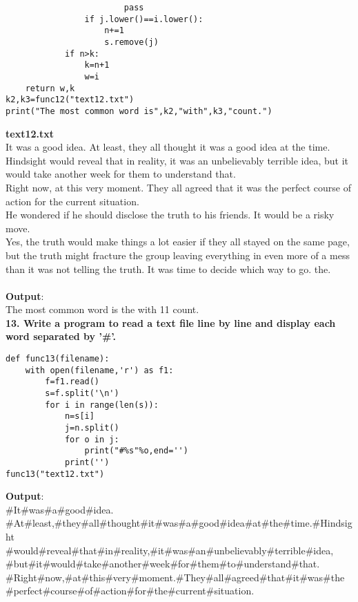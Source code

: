 \documentclass[
a4paper]{article}
\begin{document}
\begin{large}
\begin{verbatim}
                        pass
                if j.lower()==i.lower():
                    n+=1
                    s.remove(j)
            if n>k:
                k=n+1
                w=i    
    return w,k
k2,k3=func12("text12.txt")
print("The most common word is",k2,"with",k3,"count.")
\end{verbatim}
\textbf{text12.txt}\\
It was a good idea. 
At least, they all thought it was a good idea at the time. Hindsight would reveal that in reality, it was an unbelievably terrible idea, but it would take another week for them to understand that. \\
Right now, at this very moment. They all agreed that it was the perfect course of action for the current situation.\\
He wondered if he should disclose the truth to his friends. It would be a risky move. \\
Yes, the truth would make things a lot easier if they all stayed on the same page, but the truth might fracture the group leaving everything in even more of a mess than it was not telling the truth. It was time to decide which way to go. the.\\
\textbf{\\Output}:\\
The most common word is the with 11 count.
\textbf{\\13. Write a program to read a text file line by line and display each word separated by '\#'.}
\begin{verbatim}
def func13(filename):
    with open(filename,'r') as f1:
        f=f1.read()
        s=f.split('\n')
        for i in range(len(s)):
            n=s[i]
            j=n.split()
            for o in j:
                print("#%s"%o,end='')
            print('')
func13("text12.txt")
\end{verbatim}
\textbf{Output}:\\
\#It\#was\#a\#good\#idea.\\
\#At\#least,\#they\#all\#thought\#it\#was\#a\#good\#idea\#at\#the\#time.\#Hindsight\\\#would\#reveal\#that\#in\#reality,\#it\#was\#an\#unbelievably\#terrible\#idea,\\\#but\#it\#would\#take\#another\#week\#for\#them\#to\#understand\#that.\\
\#Right\#now,\#at\#this\#very\#moment.\#They\#all\#agreed\#that\#it\#was\#the\\\#perfect\#course\#of\#action\#for\#the\#current\#situation.\\

\end{large}
\end{document}
